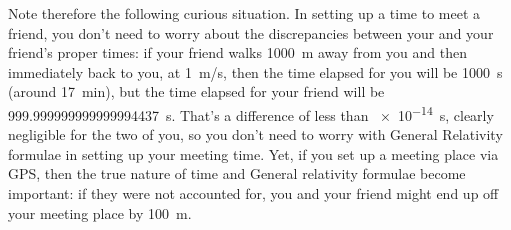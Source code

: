 \documentclass[a4paper,12pt,%
onecolumn,oneside,titlepage,%
british%
]{memoir}
\renewcommand*{\|}[1][]{\nonscript\:#1\vert\nonscript\:\mathopen{}}
\newcommand*{\yc}{c_{0}} %
\begin{document}
Note therefore the following curious situation. In setting up a time to meet a friend, you don't need to worry about the discrepancies between your and your friend's proper times: if your friend walks \qty{1000}{m} away from you and then immediately back to you, at \qty{1}{m/s}, then the time elapsed for you will be \qty{1000}{s} (around \qty{17}{min}), but the time elapsed for your friend will be \qty{999.999999999999994437}{s}. That's a difference of less than \qty{e-14}{s}, clearly negligible for the two of you, so you don't need to worry with General Relativity formulae in setting up your meeting time. Yet, if you set up a meeting place via GPS, then the true nature of time and General relativity formulae become important: if they were not accounted for, you and your friend might end up off your meeting place by \qty{100}{m}.
\end{document}
